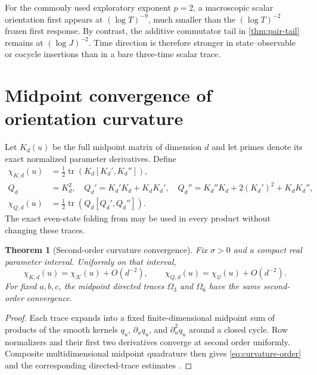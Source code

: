 \documentclass[11pt]{article}
\newtheorem{theorem}{Theorem}[section]
\theoremstyle{definition}
\theoremstyle{remark}
\newcommand{\cK}{\mathcal K}
\newcommand{\cQ}{\mathcal Q}
\newcommand{\tr}{\operatorname{tr}}
\begin{document}
For the commonly used exploratory exponent $p=2$, a macroscopic scalar
orientation first appears at $(\log T)^{-9}$, much smaller than the
$(\log T)^{-2}$ frozen first response.  By contrast, the additive commutator
tail in \cref{thm:pair-tail} remains at $(\log J)^{-2}$.  Time direction is
therefore stronger in state--observable or cocycle insertions than in a bare
three-time scalar trace.

\section{Midpoint convergence of orientation curvature}
\label{sec:nystrom}

Let $K_d(u)$ be the full midpoint matrix of dimension $d$ and let primes
denote its exact normalized parameter derivatives.  Define
\begin{align}
 \chi_{K,d}(u)
 &=\frac12\tr\left(K_d[K_d',K_d'']\right),\label{eq:chi-kd}\\
 Q_d&=K_d^2,
 \quad Q_d'=K_d'K_d+K_dK_d',
 \quad Q_d''=K_d''K_d+2(K_d')^2+K_dK_d'',\label{eq:qd}\\
 \chi_{Q,d}(u)
 &=\frac12\tr\left(Q_d[Q_d',Q_d'']\right).
 \label{eq:chi-qd}
\end{align}
The exact even-state folding from \citet{WangCycleSpectrum2026} may be used in
every product without changing these traces.

\begin{theorem}[Second-order curvature convergence]
\label{thm:curvature-convergence}
Fix $\sigma>0$ and a compact real parameter interval.  Uniformly on that
interval,
\begin{equation}\label{eq:curvature-order}
 \chi_{K,d}(u)=\chi_{\cK}(u)+O(d^{-2}),
 \qquad
 \chi_{Q,d}(u)=\chi_{\cQ}(u)+O(d^{-2}).
\end{equation}
For fixed $a,b,c$, the midpoint directed traces $\Omega_3$ and $\Omega_6$
have the same second-order convergence.
\end{theorem}

\begin{proof}
Each trace expands into a fixed finite-dimensional midpoint sum of products of
the smooth kernels $q_u$, $\partial_uq_u$, and $\partial_u^2q_u$ around a
closed cycle.  Row normalizers and their first two derivatives converge at
second order uniformly.  Composite multidimensional midpoint quadrature then
gives \eqref{eq:curvature-order} and the corresponding directed-trace
estimates \citep{Atkinson1997,WangCycleSpectrum2026}.
\end{proof}
\end{document}

